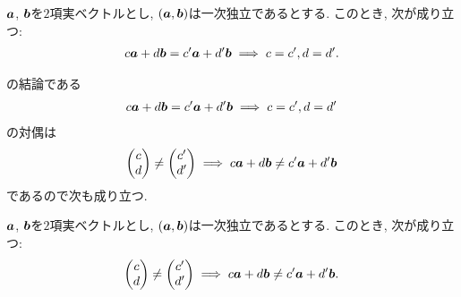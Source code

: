 \begin{prop}
  \label{thm:linindep:coef}
  $\boldsymbol{a}$, $\boldsymbol{b}$を$2$項実ベクトルとし,
  $(\boldsymbol{a},\boldsymbol{b})$は一次独立であるとする.
  このとき, 次が成り立つ:
  \begin{align*}
    c\boldsymbol{a} + d\boldsymbol{b} = c'\boldsymbol{a}+d'\boldsymbol{b}\implies c=c', d=d'.
  \end{align*}
\end{prop}
の結論である
\begin{align*}
    c\boldsymbol{a} + d\boldsymbol{b} = c'\boldsymbol{a}+d'\boldsymbol{b}\implies c=c', d=d'
\end{align*}
の対偶は
\begin{align*}
  \begin{pmatrix}c\\d\end{pmatrix}
    \neq
  \begin{pmatrix}c'\\d'\end{pmatrix}
  \implies 
    c\boldsymbol{a} + d\boldsymbol{b} \neq c'\boldsymbol{a}+d'\boldsymbol{b}
\end{align*}
であるので次も成り立つ.
\begin{cor}
  \label{thm:linindep:diffcoef}
  $\boldsymbol{a}$, $\boldsymbol{b}$を$2$項実ベクトルとし,
  $(\boldsymbol{a},\boldsymbol{b})$は一次独立であるとする.
    このとき, 次が成り立つ:
\begin{align*}
  \begin{pmatrix}c\\d\end{pmatrix}
    \neq
  \begin{pmatrix}c'\\d'\end{pmatrix}
  \implies 
    c\boldsymbol{a} + d\boldsymbol{b} \neq c'\boldsymbol{a}+d'\boldsymbol{b}.
\end{align*}
\end{cor}

